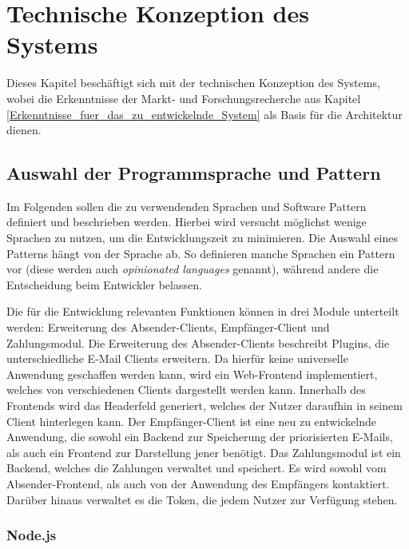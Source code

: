 
\chapter{Technische Konzeption des Systems}
\label{Technische_Konzeption_des_Systems}

Dieses Kapitel beschäftigt sich mit der technischen Konzeption des Systems, wobei die Erkenntnisse der Markt- und Forschungsrecherche aus Kapitel \ref{Erkenntnisse_fuer_das_zu_entwickelnde_System} als Basis für die Architektur dienen. 

\section{Auswahl der Programmsprache und Pattern}
\label{Auswahl_der_Technologie_und_Designpattern}

Im Folgenden sollen die zu verwendenden Sprachen und Software Pattern definiert und beschrieben werden. Hierbei wird versucht möglichst wenige Sprachen zu nutzen, um die Entwicklungszeit zu minimieren. Die Auswahl eines Patterns hängt von der Sprache ab. So definieren manche Sprachen ein Pattern vor (diese werden auch \emph{opinionated languages} genannt), während andere die Entscheidung beim Entwickler belassen.

Die für die Entwicklung relevanten Funktionen können in drei Module unterteilt werden: Erweiterung des Absender-Clients, Empfänger-Client und Zahlungsmodul. Die Erweiterung des Absender-Clients beschreibt Plugins, die unterschiedliche E-Mail Clients erweitern. Da hierfür keine universelle Anwendung geschaffen werden kann, wird ein Web-Frontend implementiert, welches von verschiedenen Clients dargestellt werden kann. Innerhalb des Frontends wird das Headerfeld generiert, welches der Nutzer daraufhin in seinem Client hinterlegen kann. Der Empfänger-Client ist eine neu zu entwickelnde Anwendung, die sowohl ein Backend zur Speicherung der priorisierten E-Mails, als auch ein Frontend zur Darstellung jener benötigt. Das Zahlungsmodul ist ein Backend, welches die Zahlungen verwaltet und speichert. Es wird sowohl vom Absender-Frontend, als auch von der Anwendung des Empfängers kontaktiert. Darüber hinaus verwaltet es die Token, die jedem Nutzer zur Verfügung stehen.

\subsection{Node.js}
\label{Node.js}

